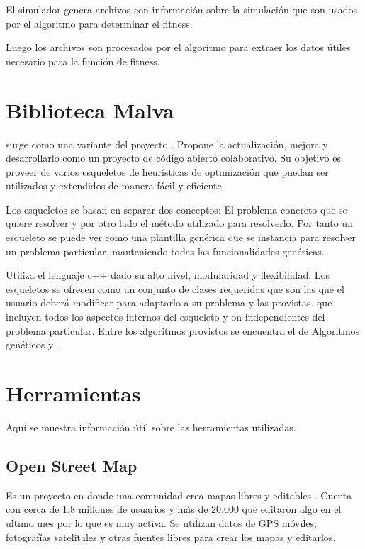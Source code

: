 El simulador genera archivos con información sobre la simulación que son usados por el algoritmo para determinar el fitness.

Luego los archivos son procesados por el algoritmo para extraer los datos útiles necesario para la función de fitness.







\section{Biblioteca Malva}

\citep{Malva} surge como una variante del proyecto \citep{Mallba}. Propone la actualización, mejora y desarrollarlo como un proyecto de código abierto colaborativo.  Su objetivo es proveer de varios esqueletos de  heurísticas de optimización que puedan ser utilizados y extendidos de manera fácil y eficiente.

Los esqueletos se basan en separar dos conceptos: El problema concreto que se quiere resolver y por otro lado el método utilizado para resolverlo. Por tanto un esqueleto se puede ver como una plantilla genérica que se instancia para resolver un problema particular, manteniendo todas las funcionalidades genéricas.

Utiliza el lenguaje c++ dado su alto nivel, modularidad y flexibilidad. Los esqueletos se ofrecen como un conjunto de clases requeridas que son las que el usuario deberá modificar para adaptarlo a su problema y las provistas. que incluyen todos los aspectos internos del esqueleto y on independientes del problema particular. Entre los algoritmos provistos se encuentra el de Algoritmos genéticos y \citep{CHC}.



\section{Herramientas}
Aquí se muestra información útil sobre las herramientas utilizadas.

\subsection{Open Street Map} 
Es un proyecto en donde una comunidad crea mapas libres y editables \citep{OSM}. Cuenta con cerca de 1.8 millones de usuarios  y  más de 20.000 que editaron algo en el ultimo mes \citep{OSMSTATS} por lo que es muy activa. Se utilizan datos de GPS móviles, fotografías satelitales y otras fuentes libres para crear los mapas y editarlos. 

